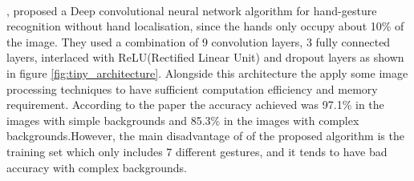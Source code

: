 \documentclass[12pt]{report}
\begin{document}
            \paragraph{}
                \cite{Bao2017}, proposed a Deep convolutional neural network algorithm for hand-gesture 
                recognition without hand localisation, since the hands only occupy about 10\% of 
                the image. They used a combination of 9 convolution layers, 3 fully connected layers, 
                interlaced with ReLU(Rectified Linear Unit) and dropout layers as shown in 
                figure \ref{fig:tiny_architecture}. Alongside this architecture the apply some image 
                processing techniques to have sufficient computation efficiency and memory requirement.
                According to the paper the accuracy achieved was 97.1\% in the images with simple backgrounds
                and 85.3\% in the images with complex backgrounds.However, the main disadvantage of of 
                the proposed algorithm is the training set which only includes 7 different gestures,
                and it tends to have bad accuracy with complex backgrounds.
             
\end{document}
